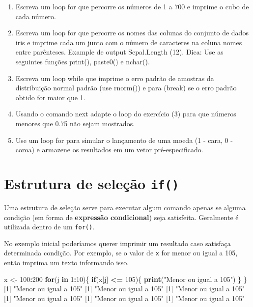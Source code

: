 \documentclass[10pt,a4paper]{book}
\newenvironment{Shaded}{\begin{snugshade}}{\end{snugshade}}
\newcommand{\KeywordTok}[1]{\textcolor[rgb]{0.13,0.29,0.53}{\textbf{#1}}}
\newcommand{\DecValTok}[1]{\textcolor[rgb]{0.00,0.00,0.81}{#1}}
\newcommand{\StringTok}[1]{\textcolor[rgb]{0.31,0.60,0.02}{#1}}
\newcommand{\ControlFlowTok}[1]{\textcolor[rgb]{0.13,0.29,0.53}{\textbf{#1}}}
\newcommand{\OperatorTok}[1]{\textcolor[rgb]{0.81,0.36,0.00}{\textbf{#1}}}
\newcommand{\NormalTok}[1]{#1}
\providecommand{\tightlist}{%
  \setlength{\itemsep}{0pt}\setlength{\parskip}{0pt}}
\begin{document}
\begin{enumerate}
\def\labelenumi{\arabic{enumi}.}
\tightlist
\item
  Escreva um loop for que percorre os números de 1 a 700 e imprime o
  cubo de cada número.
\item
  Escreva um loop for que percorre os nomes das colunas do conjunto de
  dados iris e imprime cada um junto com o número de caracteres na
  coluna nomes entre parênteses. Example de output Sepal.Length (12).
  Dica: Use as seguintes funções print(), paste0() e nchar().
\item
  Escreva um loop while que imprime o erro padrão de amostras da
  distribuição normal padrão (use rnorm()) e para (break) se o erro
  padrão obtido for maior que 1.
\item
  Usando o comando next adapte o loop do exercício (3) para que números
  menores que 0.75 não sejam mostrados.
\item
  Use um loop for para simular o lançamento de uma moeda (1 - cara, 0 -
  coroa) e armazene os resultados em um vetor pré-especificado.
\end{enumerate}

\section{\texorpdfstring{Estrutura de seleção
\texttt{if()}}{Estrutura de seleção if()}}\label{estrutura-de-seleuxe7uxe3o-if}

Uma estrutura de seleção serve para executar algum comando apenas se
alguma condição (em forma de \textbf{expressão condicional}) seja
satisfeita. Geralmente é utilizada dentro de um \texttt{for()}.

No exemplo inicial poderíamos querer imprimir um resultado caso
satisfaça determinada condição. Por exemplo, se o valor de \texttt{x}
for menor ou igual a 105, então imprima um texto informando isso.

\begin{Shaded}
\begin{Highlighting}[]
\NormalTok{x <-}\StringTok{ }\DecValTok{100}\OperatorTok{:}\DecValTok{200}
\ControlFlowTok{for}\NormalTok{(j }\ControlFlowTok{in} \DecValTok{1}\OperatorTok{:}\DecValTok{10}\NormalTok{)\{}
    \ControlFlowTok{if}\NormalTok{(x[j] }\OperatorTok{<=}\StringTok{ }\DecValTok{105}\NormalTok{)\{}
        \KeywordTok{print}\NormalTok{(}\StringTok{"Menor ou igual a 105"}\NormalTok{)}
\NormalTok{    \}}
\NormalTok{\}}
\NormalTok{[}\DecValTok{1}\NormalTok{] }\StringTok{"Menor ou igual a 105"}
\NormalTok{[}\DecValTok{1}\NormalTok{] }\StringTok{"Menor ou igual a 105"}
\NormalTok{[}\DecValTok{1}\NormalTok{] }\StringTok{"Menor ou igual a 105"}
\NormalTok{[}\DecValTok{1}\NormalTok{] }\StringTok{"Menor ou igual a 105"}
\NormalTok{[}\DecValTok{1}\NormalTok{] }\StringTok{"Menor ou igual a 105"}
\NormalTok{[}\DecValTok{1}\NormalTok{] }\StringTok{"Menor ou igual a 105"}
\end{Highlighting}
\end{Shaded}
\end{document}
